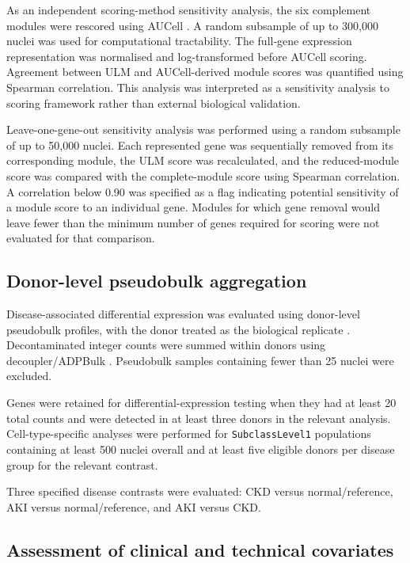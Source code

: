 \documentclass[10pt,letterpaper]{article}
\begin{document}
As an independent scoring-method sensitivity analysis, the six complement modules were rescored using AUCell \cite{Aibar_2017}. A random subsample of up to 300,000 nuclei was used for computational tractability. The full-gene expression representation was normalised and log-transformed before AUCell scoring. Agreement between ULM and AUCell-derived module scores was quantified using Spearman correlation. This analysis was interpreted as a sensitivity analysis to scoring framework rather than external biological validation.

Leave-one-gene-out sensitivity analysis was performed using a random subsample of up to 50,000 nuclei. Each represented gene was sequentially removed from its corresponding module, the ULM score was recalculated, and the reduced-module score was compared with the complete-module score using Spearman correlation. A correlation below 0.90 was specified as a flag indicating potential sensitivity of a module score to an individual gene. Modules for which gene removal would leave fewer than the minimum number of genes required for scoring were not evaluated for that comparison.

\subsection*{Donor-level pseudobulk aggregation}

Disease-associated differential expression was evaluated using donor-level pseudobulk profiles, with the donor treated as the biological replicate \cite{Zimmerman_Espeland_Langefeld_2021, Squair_Gautier_Kathe_Anderson_James_Hutson_Hudelle_Qaiser_Matson_Barraud}. Decontaminated integer counts were summed within donors using decoupler/ADPBulk \cite{Badia-i-Mompel2022}. Pseudobulk samples containing fewer than 25 nuclei were excluded.

Genes were retained for differential-expression testing when they had at least 20 total counts and were detected in at least three donors in the relevant analysis. Cell-type-specific analyses were performed for \texttt{SubclassLevel1} populations containing at least 500 nuclei overall and at least five eligible donors per disease group for the relevant contrast.

Three specified disease contrasts were evaluated: CKD versus normal/reference, AKI versus normal/reference, and AKI versus CKD.

\subsection*{Assessment of clinical and technical covariates}
\end{document}
